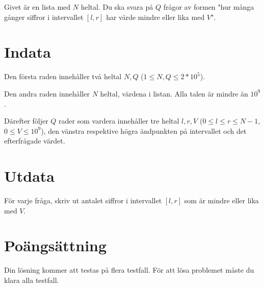 Givet är en lista med $N$ heltal. Du ska svara på $Q$ frågor av formen "hur många gånger siffror
i intervallet $[l,r]$ har värde mindre eller lika med $V$".

\section*{Indata}
Den första raden innehåller två heltal $N,Q$ ($1 \leq N,Q \leq 2*10^5$).

Den andra raden innehåller $N$ heltal, värdena i listan. Alla talen är mindre än $10^9$.

Därefter följer $Q$ rader som vardera innehåller tre heltal $l, r, V$ ($0 \leq l \leq r \leq N-1$, $0 \leq V \leq 10^9$),
den vänstra respektive högra ändpunkten på intervallet och det efterfrågade värdet.

\section*{Utdata}
För varje fråga, skriv ut antalet siffror i intervallet $[l,r]$ som är mindre eller lika med $V$.

\section*{Poängsättning}
Din lösning kommer att testas på flera testfall.
\noindent
För att lösa problemet måste du klara alla testfall.

